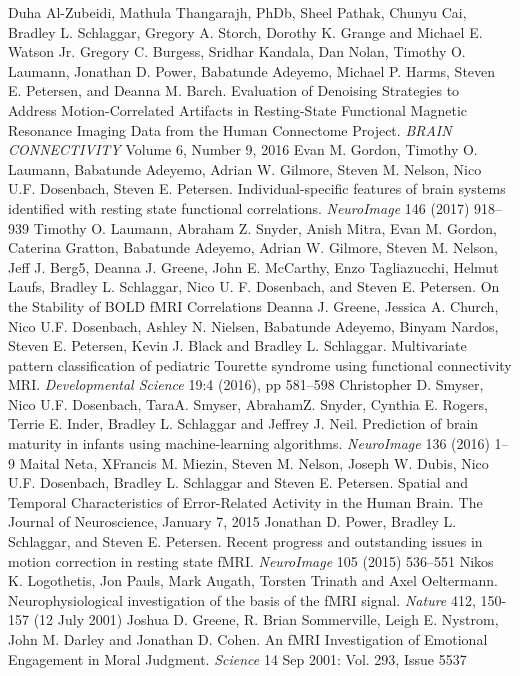 \documentclass[11pt]{article}
\begin{document}
\begin{thebibliography}{1}
 Duha Al-Zubeidi, Mathula Thangarajh, PhDb, Sheel Pathak, Chunyu Cai, Bradley L. Schlaggar, Gregory A. Storch, Dorothy K. Grange and Michael E. Watson Jr.
 Gregory C. Burgess, Sridhar Kandala, Dan Nolan, Timothy O. Laumann, Jonathan D. Power, Babatunde Adeyemo, Michael P. Harms, Steven E. Petersen, and Deanna M. Barch. Evaluation of Denoising Strategies to Address Motion-Correlated Artifacts in Resting-State Functional Magnetic Resonance Imaging Data from the Human Connectome Project. \textit{BRAIN CONNECTIVITY} Volume 6, Number 9, 2016
 Evan M. Gordon, Timothy O. Laumann, Babatunde Adeyemo, Adrian W. Gilmore, Steven M. Nelson, Nico U.F. Dosenbach, Steven E. Petersen. Individual-specific features of brain systems identified with resting state functional correlations. \textit{NeuroImage} 146 (2017) 918–939
 Timothy O. Laumann, Abraham Z. Snyder, Anish Mitra, Evan M. Gordon, Caterina Gratton, Babatunde Adeyemo, Adrian W. Gilmore, Steven M. Nelson, Jeff J. Berg5, Deanna J. Greene, John E. McCarthy, Enzo Tagliazucchi, Helmut Laufs, Bradley L. Schlaggar, Nico U. F. Dosenbach, and Steven E. Petersen. On the Stability of BOLD fMRI Correlations
 Deanna J. Greene, Jessica A. Church, Nico U.F. Dosenbach, Ashley N. Nielsen, Babatunde Adeyemo, Binyam Nardos, Steven E. Petersen, Kevin J. Black and Bradley L. Schlaggar. Multivariate pattern classification of pediatric Tourette syndrome using functional connectivity MRI. \textit{Developmental Science} 19:4 (2016), pp 581–598
 Christopher D. Smyser, Nico U.F. Dosenbach, TaraA. Smyser, AbrahamZ. Snyder, Cynthia E. Rogers, Terrie E. Inder, Bradley L. Schlaggar and Jeffrey J. Neil. Prediction of brain maturity in infants using machine-learning algorithms. \textit{NeuroImage} 136 (2016) 1–9
 Maital Neta, XFrancis M. Miezin, Steven M. Nelson, Joseph W. Dubis, Nico U.F. Dosenbach, Bradley L. Schlaggar and Steven E. Petersen. Spatial and Temporal Characteristics of Error-Related Activity in the Human Brain. The Journal of Neuroscience, January 7, 2015
 Jonathan D. Power, Bradley L. Schlaggar, and Steven E. Petersen. Recent progress and outstanding issues in motion correction in resting state fMRI. \textit{NeuroImage} 105 (2015) 536–551
 Nikos K. Logothetis, Jon Pauls, Mark Augath, Torsten Trinath and Axel Oeltermann. Neurophysiological investigation of the basis of the fMRI signal. \textit{Nature} 412, 150-157 (12 July 2001)
Joshua D. Greene, R. Brian Sommerville, Leigh E. Nystrom, John M. Darley and Jonathan D. Cohen. An fMRI Investigation of Emotional Engagement in Moral Judgment. \textit{Science}  14 Sep 2001: Vol. 293, Issue 5537

\end{thebibliography}
\end{document}
